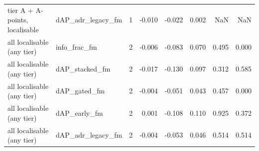 \begin{tabular}{llrrrrrr}
tier A + A-points, localisable & dAP\_adr\_legacy\_fm & 1 & -0.010 & -0.022 & 0.002 & NaN & NaN \\
all localisable (any tier) & info\_frac\_fm & 2 & -0.006 & -0.083 & 0.070 & 0.495 & 0.000 \\
all localisable (any tier) & dAP\_stacked\_fm & 2 & -0.017 & -0.130 & 0.097 & 0.312 & 0.585 \\
all localisable (any tier) & dAP\_gated\_fm & 2 & -0.004 & -0.051 & 0.043 & 0.457 & 0.000 \\
all localisable (any tier) & dAP\_early\_fm & 2 & 0.001 & -0.108 & 0.110 & 0.925 & 0.372 \\
all localisable (any tier) & dAP\_adr\_legacy\_fm & 2 & -0.004 & -0.053 & 0.046 & 0.514 & 0.514 \\
\bottomrule
\end{tabular}
